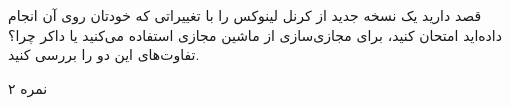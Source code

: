 \documentclass[../main.tex]{subfiles}
\begin{document}

قصد دارید یک نسخه جدید از کرنل لینوکس را با تغییراتی که خودتان روی آن انجام داده‌اید امتحان کنید، برای مجازی‌سازی از ماشین مجازی استفاده می‌کنید یا داکر چرا؟ تفاوت‌های این دو را بررسی کنید.

۲ نمره
\end{document}

